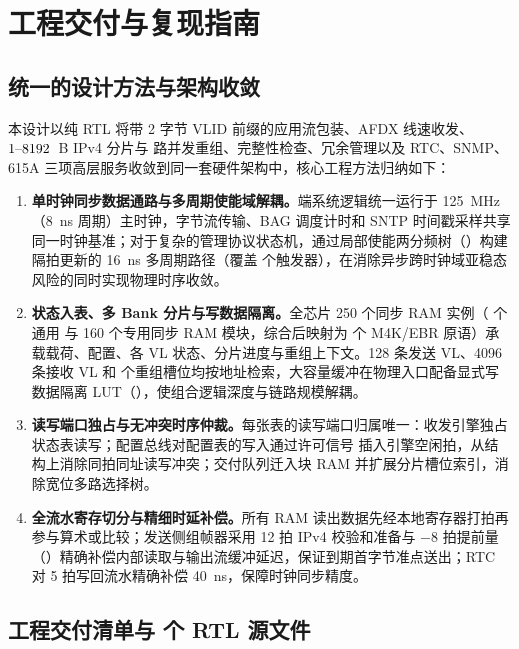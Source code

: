 \chapter{工程交付与复现指南}\label{ch:limit}

\section{统一的设计方法与架构收敛}\label{sec:designmethod}

本设计以纯 RTL 将带 2 字节 VLID 前缀的应用流包装、AFDX 线速收发、$1\text{--}8192$~B IPv4 分片与 \ReasmContexts{} 路并发重组、完整性检查、冗余管理以及 RTC、SNMP、615A 三项高层服务收敛到同一套硬件架构中，核心工程方法归纳如下：

\begin{enumerate}[leftmargin=2em,itemsep=2pt]
  \item \textbf{单时钟同步数据通路与多周期使能域解耦。}端系统逻辑统一运行于 125~MHz（8~ns 周期）主时钟，字节流传输、BAG 调度计时和 SNTP 时间戳采样共享同一时钟基准；对于复杂的管理协议状态机，通过局部使能两分频树（）构建隔拍更新的 16~ns 多周期路径（覆盖 \MulticycleRegs{} 个触发器），在消除异步跨时钟域亚稳态风险的同时实现物理时序收敛。
  \item \textbf{状态入表、多 Bank 分片与写数据隔离。}全芯片 250 个同步 RAM 实例（\RamSdpCount{} 个通用  与 160 个专用同步 RAM 模块，综合后映射为 \Mem{} 个 M4K/EBR 原语）承载载荷、配置、各 VL 状态、分片进度与重组上下文。128 条发送 VL、4096 条接收 VL 和 \ReasmContexts{} 个重组槽位均按地址检索，大容量缓冲在物理入口配备显式写数据隔离 LUT（），使组合逻辑深度与链路规模解耦。
  \item \textbf{读写端口独占与无冲突时序仲裁。}每张表的读写端口归属唯一：收发引擎独占状态表读写；配置总线对配置表的写入通过许可信号  插入引擎空闲拍，从结构上消除同拍同址读写冲突；交付队列迁入块 RAM 并扩展分片槽位索引，消除宽位多路选择树。
  \item \textbf{全流水寄存切分与精细时延补偿。}所有 RAM 读出数据先经本地寄存器打拍再参与算术或比较；发送侧组帧器采用 12 拍 IPv4 校验和准备与 $-8$ 拍提前量（）精确补偿内部读取与输出流缓冲延迟，保证到期首字节准点送出；RTC 对 5 拍写回流水精确补偿 40~ns，保障时钟同步精度。
\end{enumerate}

\section{工程交付清单与 \RtlFileCount{} 个 RTL 源文件}\label{sec:deliveryfiles}

